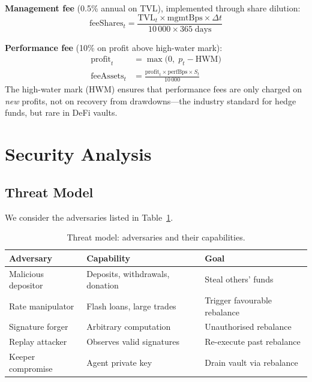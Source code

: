 \documentclass[12pt]{article}
\begin{document}
\textbf{Management fee} (0.5\% annual on TVL), implemented through share dilution:
\begin{equation}
  \text{feeShares}_t = \frac{\text{TVL}_t \times \text{mgmtBps} \times \Delta t}{10\,000 \times 365 \;\text{days}}
  \label{eq:mgmt-fee}
\end{equation}

\textbf{Performance fee} (10\% on profit above high-water mark):
\begin{align}
  \text{profit}_t &= \max\!\big(0,\; p_t - \text{HWM}\big) \label{eq:profit} \\
  \text{feeAssets}_t &= \frac{\text{profit}_t \times \text{perfBps} \times S_t}{10\,000} \label{eq:perf-fee}
\end{align}
The high-water mark (HWM) ensures that performance fees are only charged on \emph{new} profits, not on recovery from drawdowns---the industry standard for hedge funds, but rare in DeFi vaults.

\section{Security Analysis}

\subsection{Threat Model}

We consider the adversaries listed in Table~\ref{tab:threats}.

\begin{table}[H]
\centering
\caption{Threat model: adversaries and their capabilities.}
\label{tab:threats}
\small
\begin{tabular}{@{}lll@{}}
\toprule
\textbf{Adversary} & \textbf{Capability} & \textbf{Goal} \\
\midrule
Malicious depositor  & Deposits, withdrawals, donation & Steal others' funds \\
Rate manipulator     & Flash loans, large trades       & Trigger favourable rebalance \\
Signature forger     & Arbitrary computation           & Unauthorised rebalance \\
Replay attacker      & Observes valid signatures       & Re-execute past rebalance \\
Keeper compromise    & Agent private key               & Drain vault via rebalance \\
\bottomrule
\end{tabular}
\end{table}
\end{document}
